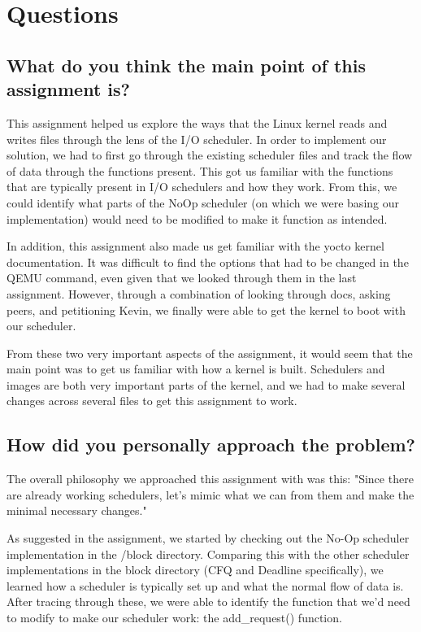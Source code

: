 \documentclass[letterpaper,10pt,titlepage]{article}
\begin{document}
\section{Questions}

\subsection{What do you think the main point of this assignment is?}
This assignment helped us explore the ways that the Linux kernel reads and writes files through the lens of the I/O scheduler.
In order to implement our solution, we had to first go through the existing scheduler files and track the flow of data through the functions present. 
This got us familiar with the functions that are typically present in I/O schedulers and how they work.
From this, we could identify what parts of the NoOp scheduler (on which we were basing our implementation) would need to be modified to make it function as intended.

In addition, this assignment also made us get familiar with the yocto kernel documentation.
It was difficult to find the options that had to be changed in the QEMU command, even given that we looked through them in the last assignment.
However, through a combination of looking through docs, asking peers, and petitioning Kevin, we finally were able to get the kernel to boot with our scheduler.

From these two very important aspects of the assignment, it would seem that the main point was to get us familiar with how a kernel is built. 
Schedulers and images are both very important parts of the kernel, and we had to make several changes across several files to get this assignment to work. 

\subsection{How did you personally approach the problem?}
The overall philosophy we approached this assignment with was this: 
"Since there are already working schedulers, let's mimic what we can from them and make the minimal necessary changes."

As suggested in the assignment, we started by checking out the No-Op scheduler implementation in the /block directory.
Comparing this with the other scheduler implementations in the block directory (CFQ and Deadline specifically), we learned how a scheduler is typically set up and what the normal flow of data is. 
After tracing through these, we were able to identify the function that we'd need to modify to make our scheduler work: the add\_request() function.
\end{document}
